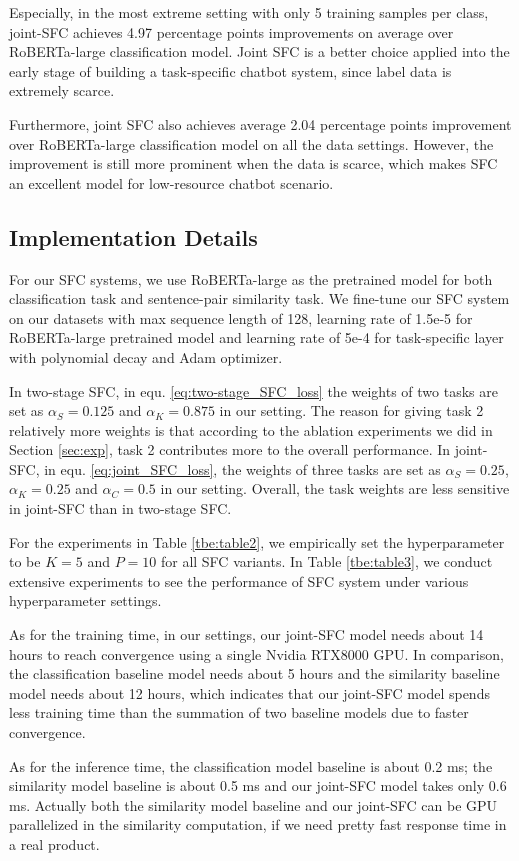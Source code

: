 Especially, in the most extreme setting with only 5 training samples per class, joint-SFC achieves 4.97 percentage points improvements on average over RoBERTa-large classification model. 
Joint SFC is a better choice applied into the early stage of building a task-specific chatbot system, since label data is extremely scarce.

Furthermore, joint SFC also achieves average 2.04 percentage points improvement over RoBERTa-large classification model on all the data settings. 
However, the improvement is still more prominent when the data is scarce, which makes SFC an excellent model for low-resource chatbot scenario.


\subsection{Implementation Details}
For  our  SFC  systems,  we  use RoBERTa-large as the pretrained model for both
classification  task  and  sentence-pair similarity task. We fine-tune
our  SFC  system  on  our datasets with max sequence length of 128,
learning  rate  of 1.5e-5 for RoBERTa-large pretrained model and learning rate
of  5e-4  for  task-specific  layer  with polynomial decay and Adam optimizer.

In two-stage SFC, in equ. \ref{eq:two-stage_SFC_loss} the weights of two tasks
are  set  as  $\alpha_S=0.125$ and $\alpha_K=0.875$ in our setting. The reason
for  giving  task  2 relatively more weights is that according to the ablation
experiments  we  did  in Section \ref{sec:exp}, task 2 contributes more to the
overall  performance.  In  joint-SFC,  in  equ.  \ref{eq:joint_SFC_loss}, the
weights  of  three  tasks  are  set  as  $\alpha_S=0.25$,  $\alpha_K=0.25$ and
$\alpha_C=0.5$  in  our setting. Overall, the task weights are less sensitive
in joint-SFC than in two-stage SFC.

For  the  experiments  in  Table  \ref{tbe:table2},  we  empirically  set  the
hyperparameter  to  be  $K=5$  and  $P=10$  for  all  SFC  variants.  In Table
\ref{tbe:table3},  we  conduct extensive experiments to see the performance of
SFC system under various hyperparameter settings.

As for the training time, in our settings, our joint-SFC model needs about 14
hours to reach convergence using a single Nvidia RTX8000 GPU. In comparison, the classification baseline model needs about 5 hours and the similarity baseline model
needs about 12 hours, which indicates that our joint-SFC model spends less training
time than the summation of two baseline models due to faster convergence. 

As for the inference time, the classification model baseline is about 0.2 ms;
the similarity model baseline is about 0.5 ms and our joint-SFC model takes only 0.6 ms.
Actually both the similarity model baseline and our joint-SFC can be GPU
parallelized in the similarity computation, if we need pretty fast response time
in a real product.

